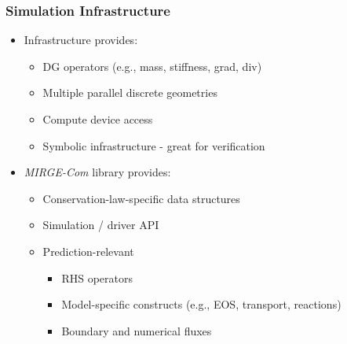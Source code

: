 \begin{frame}\frametitle{Simulation Infrastructure}
\begin{multicols}{2}
\begin{itemize}
\item Infrastructure provides:
  \begin{itemize}
  \item DG operators (e.g., mass, stiffness, grad, div)%
  \item Multiple parallel discrete geometries 
  \item Compute device access
  \item Symbolic infrastructure - great for verification
  \end{itemize}
\end{itemize}
\columnbreak
\begin{itemize}
\item \textit{MIRGE-Com} library provides:
  \begin{itemize}
  \item Conservation-law-specific data structures
  \item Simulation / driver API
  \item Prediction-relevant
    \begin{itemize}
    \item RHS operators
    \item Model-specific constructs (e.g., EOS, transport, reactions)
    \item Boundary and numerical fluxes
    \end{itemize}
  \end{itemize}
\end{itemize}
\end{multicols}
\vspace{-10pt}

%  
%  
\end{frame}



